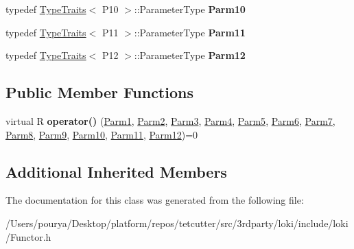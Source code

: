 \begin{DoxyCompactItemize}
\item 
\hypertarget{classLoki_1_1FunctorImpl_3_01R_00_01_01_01_01_01_01_01_01_01_01_01_01_01_01_01_01_01_01_01_01_017c788c46fcb2e521ccdf7053452b5922_a5773b52e9e65b290320436785d471769}{}typedef \hyperlink{classLoki_1_1TypeTraits}{Type\+Traits}$<$ P10 $>$\+::Parameter\+Type {\bfseries Parm10}\label{classLoki_1_1FunctorImpl_3_01R_00_01_01_01_01_01_01_01_01_01_01_01_01_01_01_01_01_01_01_01_01_017c788c46fcb2e521ccdf7053452b5922_a5773b52e9e65b290320436785d471769}

\item 
\hypertarget{classLoki_1_1FunctorImpl_3_01R_00_01_01_01_01_01_01_01_01_01_01_01_01_01_01_01_01_01_01_01_01_017c788c46fcb2e521ccdf7053452b5922_a8a671eb6a166b0794144b5a16c4c86b8}{}typedef \hyperlink{classLoki_1_1TypeTraits}{Type\+Traits}$<$ P11 $>$\+::Parameter\+Type {\bfseries Parm11}\label{classLoki_1_1FunctorImpl_3_01R_00_01_01_01_01_01_01_01_01_01_01_01_01_01_01_01_01_01_01_01_01_017c788c46fcb2e521ccdf7053452b5922_a8a671eb6a166b0794144b5a16c4c86b8}

\item 
\hypertarget{classLoki_1_1FunctorImpl_3_01R_00_01_01_01_01_01_01_01_01_01_01_01_01_01_01_01_01_01_01_01_01_017c788c46fcb2e521ccdf7053452b5922_a730c0fc487e0418f7e99bf8a6efa9bf2}{}typedef \hyperlink{classLoki_1_1TypeTraits}{Type\+Traits}$<$ P12 $>$\+::Parameter\+Type {\bfseries Parm12}\label{classLoki_1_1FunctorImpl_3_01R_00_01_01_01_01_01_01_01_01_01_01_01_01_01_01_01_01_01_01_01_01_017c788c46fcb2e521ccdf7053452b5922_a730c0fc487e0418f7e99bf8a6efa9bf2}

\end{DoxyCompactItemize}
\subsection*{Public Member Functions}
\begin{DoxyCompactItemize}
\item 
\hypertarget{classLoki_1_1FunctorImpl_3_01R_00_01_01_01_01_01_01_01_01_01_01_01_01_01_01_01_01_01_01_01_01_017c788c46fcb2e521ccdf7053452b5922_aa33ed3c638a5f5f4080a0954619d51b1}{}virtual R {\bfseries operator()} (\hyperlink{classLoki_1_1EmptyType}{Parm1}, \hyperlink{classLoki_1_1EmptyType}{Parm2}, \hyperlink{classLoki_1_1EmptyType}{Parm3}, \hyperlink{classLoki_1_1EmptyType}{Parm4}, \hyperlink{classLoki_1_1EmptyType}{Parm5}, \hyperlink{classLoki_1_1EmptyType}{Parm6}, \hyperlink{classLoki_1_1EmptyType}{Parm7}, \hyperlink{classLoki_1_1EmptyType}{Parm8}, \hyperlink{classLoki_1_1EmptyType}{Parm9}, \hyperlink{classLoki_1_1EmptyType}{Parm10}, \hyperlink{classLoki_1_1EmptyType}{Parm11}, \hyperlink{classLoki_1_1EmptyType}{Parm12})=0\label{classLoki_1_1FunctorImpl_3_01R_00_01_01_01_01_01_01_01_01_01_01_01_01_01_01_01_01_01_01_01_01_017c788c46fcb2e521ccdf7053452b5922_aa33ed3c638a5f5f4080a0954619d51b1}

\end{DoxyCompactItemize}
\subsection*{Additional Inherited Members}


The documentation for this class was generated from the following file\+:\begin{DoxyCompactItemize}
\item 
/\+Users/pourya/\+Desktop/platform/repos/tetcutter/src/3rdparty/loki/include/loki/Functor.\+h\end{DoxyCompactItemize}
